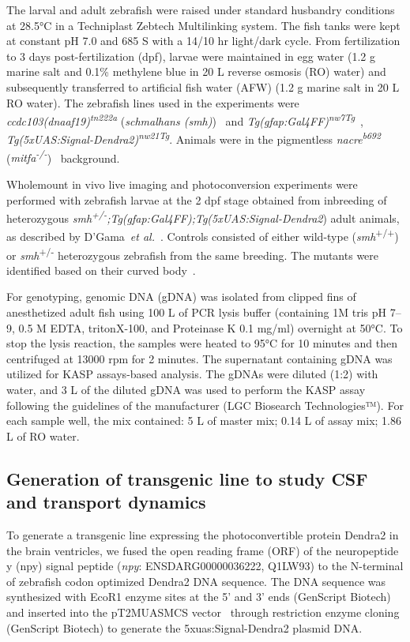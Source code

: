 \documentclass{WileyMSP-template}
\begin{document}
The larval and adult zebrafish were raised under standard husbandry
conditions at 28.5°C in a Techniplast Zebtech Multilinking system.
The fish tanks were kept at constant pH 7.0 and 685 \textmu S with a
14/10 hr light/dark cycle.
From fertilization to 3 days post-fertilization (dpf), larvae were maintained in egg
water (1.2 g marine salt and 0.1\% methylene blue in 20 L reverse osmosis (RO) water)
and subsequently transferred to artificial fish water (AFW)
(1.2 g marine salt in 20 L RO water). The zebrafish lines used in the experiments were
\emph{ccdc103(dnaaf19)\textsuperscript{tn222a}}
(\emph{schmalhans (smh)})~\cite{Jau-NianChen1997Left-rightZebrafish}
and \emph{Tg(gfap:Gal4FF)\textsuperscript{nw7Tg}}~\cite{DiazVerdugo2019Glia-neuronSeizures},
\emph{Tg(5xUAS:Signal-Dendra2)\textsuperscript{nw21Tg}}.
Animals were in the pigmentless \emph{nacre\textsuperscript{b692}}
(\emph{mitfa\textsuperscript{-/-}})~\cite{JamesA.Lister1999NacreFate} background.

Wholemount in vivo live imaging and photoconversion
experiments were performed with zebrafish larvae at the 2 dpf stage obtained from inbreeding of heterozygous
\emph{smh\textsuperscript{+/-};Tg(gfap:Gal4FF);Tg(5xUAS:Signal-Dendra2})
adult animals, as described by D'Gama~\emph{et al.}~\cite{DGama2024Cilia-mediatedBrain}.
Controls consisted of either wild-type (\emph{smh}\textsuperscript{+/+})
or \emph{smh}\textsuperscript{+/-} heterozygous zebrafish from the same breeding.
The mutants were identified based on their curved body~\cite{Jau-NianChen1997Left-rightZebrafish}.

For genotyping, genomic DNA (gDNA) was isolated from clipped fins of anesthetized adult
fish using 100 \textmu L of PCR lysis buffer (containing 1M tris pH 7--9, 0.5 M EDTA,
tritonX-100, and Proteinase K 0.1 mg/ml) overnight at 50°C.
To stop the lysis reaction, the samples were heated to 95°C for 10 minutes
and then centrifuged at 13000 rpm for 2 minutes.
The supernatant containing gDNA was utilized for KASP assays-based analysis.
The gDNAs were diluted (1:2) with water, and 3 \textmu L of the diluted gDNA was
used to perform the KASP assay following the guidelines of the manufacturer (LGC Biosearch Technologies™).
For each sample well, the  mix contained: 5 \textmu L of master mix; 0.14
\textmu L of assay mix; 1.86 \textmu L of RO water.

\subsection{Generation of transgenic line to study CSF and transport dynamics} 
To generate a transgenic line expressing the photoconvertible protein Dendra2 in
the brain ventricles, we fused the open reading frame (ORF)
of the neuropeptide y (npy) signal peptide
(\emph{npy}: ENSDARG00000036222, Q1LW93) to the N-terminal of
zebrafish codon optimized Dendra2 DNA sequence.
The DNA sequence was synthesized with EcoR1 enzyme sites at the 5’ and
3’ ends (GenScript Biotech) and inserted into the
pT2MUASMCS vector~\cite{Asakawa2008GeneticZebrafish}
through restriction enzyme cloning (GenScript Biotech)
to generate the 5xuas:Signal-Dendra2 plasmid DNA.
\end{document}
